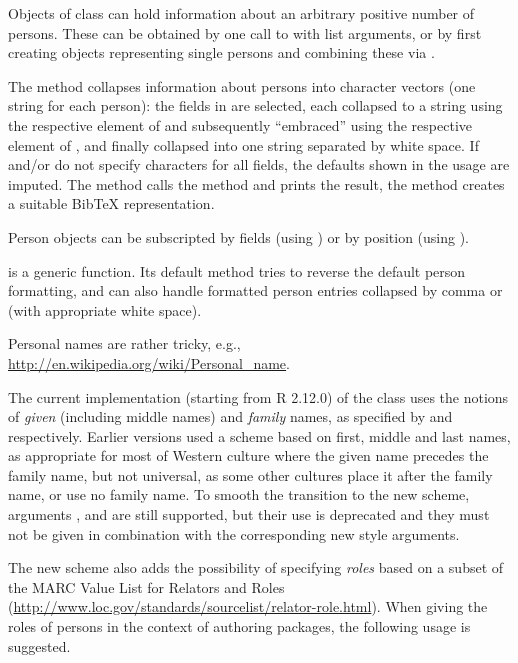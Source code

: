 %
\begin{Details}\relax
Objects of class  can hold information about an
arbitrary positive number of persons.  These can be obtained by one
call to  with list arguments, or by first creating
objects representing single persons and combining these via
.

The  method collapses information about persons into
character vectors (one string for each person): the fields in
 are selected, each collapsed to a string using the
respective element of  and subsequently
``embraced'' using the respective element of , and
finally collapsed into one string separated by white space.  If
 and/or  do not specify characters for all
fields, the defaults shown in the usage are imputed.  The
 method calls the  method and prints the
result, the  method creates a suitable BibTeX
representation.

Person objects can be subscripted by fields (using \code{\$}) or by
position (using \code{[}).

 is a generic function.  Its default method tries to
reverse the default person formatting, and can also handle formatted
person entries collapsed by comma or  (with appropriate
white space).

Personal names are rather tricky, e.g.,
\url{http://en.wikipedia.org/wiki/Personal_name}.

The current implementation (starting from R 2.12.0) of the
 class uses the notions of \emph{given} (including
middle names) and \emph{family} names, as specified by 
and  respectively.  Earlier versions used a scheme based
on first, middle and last names, as appropriate for most of Western
culture where the given name precedes the family name, but not
universal, as some other cultures place it after the family name, or
use no family name.  To smooth the transition to the new scheme,
arguments ,  and  are still
supported, but their use is deprecated and they must not be given in
combination with the corresponding new style arguments.

The new scheme also adds the possibility of specifying \emph{roles}
based on a subset of the MARC Value List for Relators and Roles
(\url{http://www.loc.gov/standards/sourcelist/relator-role.html}).
When giving the roles of persons in the context of authoring \R{}
packages, the following usage is suggested.
\begin{description}


\end{description}
\end{Details}
